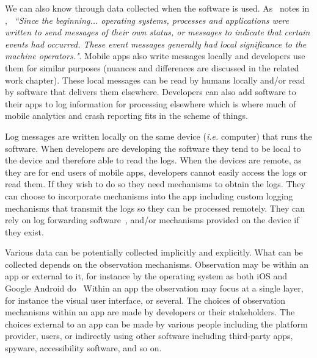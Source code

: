We can also know through data collected when the software is used. As~ notes in , ~\emph{``Since the beginning... operating systems, processes and applications were written to send messages of their own status, or messages to indicate that certain events had occurred. These event messages generally had local significance to the machine operators."}. Mobile apps also write messages locally and developers use them for similar purposes (nuances and differences are discussed in the related work chapter). These local messages can be read by humans locally and/or read by software that delivers them elsewhere. Developers can also add software to their apps to log information for processing elsewhere which is where much of mobile analytics and crash reporting fits in the scheme of things.

Log messages are written locally on the same device (\textit{i.e.} computer) that runs the software. When developers are developing the software they tend to be local to the device and therefore able to read the logs. When the devices are remote, as they are for end users of mobile apps, developers cannot easily access the logs or read them. If they wish to do so they need mechanisms to obtain the logs. They can choose to incorporate mechanisms into the app including custom logging mechanisms that transmit the logs so they can be processed remotely. They can rely on log forwarding software~, and/or mechanisms provided on the device if they exist.


Various data can be potentially collected implicitly and explicitly. What can be collected depends on the observation mechanisms. Observation may be within an app or external to it, for instance by the operating system as both iOS  and Google Android do~ %
%
Within an app the observation may focus at a single layer, for instance the visual user interface, or several. The choices of observation mechanisms within an app are made by developers or their stakeholders. The choices external to an app can be made by various people including the platform provider, users, or indirectly using other software including third-party apps, spyware, accessibility software, and so on.

